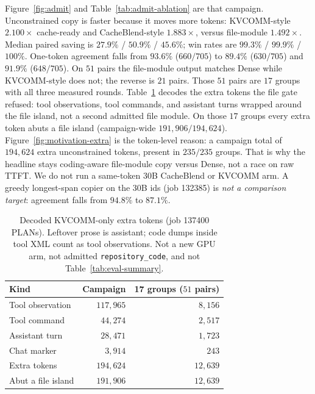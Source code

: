 Figure~\ref{fig:admit} and Table~\ref{tab:admit-ablation} are that
campaign. Unconstrained copy is faster because it moves more tokens:
KVCOMM-style $2.100\times$ cache-ready and CacheBlend-style $1.883\times$,
versus file-module $1.492\times$. Median paired saving is $27.9\%$ /
$50.9\%$ / $45.6\%$; win rates are $99.3\%$ / $99.9\%$ / $100\%$.
One-token agreement falls from $93.6\%$
($660/705$) to $89.4\%$ ($630/705$) and $91.9\%$ ($648/705$). On
$51$ pairs the file-module output matches Dense while KVCOMM-style
does not; the reverse is $21$ pairs. Those $51$ pairs are $17$ groups
with all three measured rounds. Table~\ref{tab:copier-extra-kinds}
decodes the extra tokens the file gate refused: tool observations,
tool commands, and assistant turns wrapped around the file island,
not a second admitted file module. On those $17$ groups every extra
token abuts a file island (campaign-wide $191{,}906/194{,}624$).
Figure~\ref{fig:motivation-extra} is the token-level reason: a campaign
total of $194{,}624$ extra unconstrained tokens, present in $235/235$
groups. That is why the headline stays coding-aware file-module copy
versus Dense, not a race on raw TTFT. We do not run a same-token 30B
CacheBlend or KVCOMM arm. A greedy longest-span copier on the 30B ids
(job 132385) is \emph{not a comparison target}: agreement falls from
$94.8\%$ to $87.1\%$.

\begin{table}[t]
\centering
\small
\caption{Decoded KVCOMM-only extra tokens (job 137400 PLANs). Leftover
prose is assistant; code dumps inside tool XML count as tool
observations. Not a new GPU arm, not admitted
\texttt{repository\_code}, and not Table~\ref{tab:eval-summary}.}
\label{tab:copier-extra-kinds}
\begin{tabular}{lrr}
\toprule
\textbf{Kind} & \textbf{Campaign} & \textbf{17 groups ($51$ pairs)} \\
\midrule
Tool observation & $117{,}965$ & $8{,}156$ \\
Tool command & $44{,}274$ & $2{,}517$ \\
Assistant turn & $28{,}471$ & $1{,}723$ \\
Chat marker & $3{,}914$ & $243$ \\
\midrule
Extra tokens & $194{,}624$ & $12{,}639$ \\
Abut a file island & $191{,}906$ & $12{,}639$ \\
\bottomrule
\end{tabular}
\end{table}

